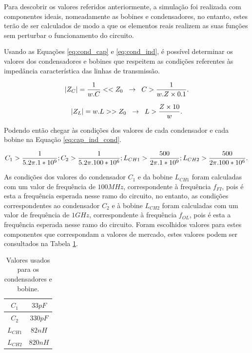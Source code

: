 \documentclass[11pt]{article}
\numberwithin{equation}{section}
\begin{document}
Para descobrir os valores referidos anteriormente, a simulação foi realizada com componentes ideais, nomeadamente as bobines e condensadores, no entanto, estes terão de ser calculados de modo a que os elementos reais realizem as suas funções sem perturbar o funcionamento do circuito.

Usando as Equações \ref{eq:cond_cap} e \ref{eq:cond_ind}, é possível determinar os valores dos condensadores e bobines que respeitem as condições referentes às impedância característica das linhas de transmissão.

\begin{equation}
\lvert Z_C \rvert = \frac{1}{w.C} << Z_0 \hspace{2mm} \rightarrow \hspace{2mm} C > \frac{1}{w.Z \times 0.1}.
\label{eq:cond_cap}
\end{equation}

\begin{equation}
\lvert Z_L \rvert = w.L >> Z_0 \hspace{2mm} \rightarrow \hspace{2mm} L > \frac{Z \times 10}{w}.
\label{eq:cond_ind}
\end{equation}

Podendo então chegar às condições dos valores de cada condensador e cada bobine na Equação \ref{eq:cap_ind_cond}.

\begin{equation}
\centering
C_{1}>\frac{1}{5.2\pi.1*10^{9}}; C_{2}>\frac{1}{5.2\pi.100*10^{6}}; L_{CH1}>\frac{500}{2\pi.1*10^{9}}; L_{CH2}>\frac{500}{2\pi.100*10^{6}}.
\label{eq:cap_ind_cond}
\end{equation}

As condições dos valores do condensador $ C_{1} $ e da bobine $ L_{CH1} $ foram calculadas com um valor de frequência de $ 100MHz $, correspondente à frequência $ f_{FI} $, pois é esta a frequência esperada nesse ramo do circuito, no entanto, as condições correspondentes ao condensador $ C_{2} $ e à bobine $ L_{CH2} $ foram calculadas com um valor de frequência de $ 1GHz $, correspondente à frequência $ f_{OL} $, pois é esta a frequência esperada nesse ramo do circuito. Foram escolhidos valores para estes componentes que correspondam a valores de mercado, estes valores podem ser consultados na Tabela \ref{tab:cap_ind}.

\begin{table}
	\centering
	\begin{tabular}{|c||c|}
		\hline $ C_{1} $ & $ 33pF $ \\ 
		\hline $ C_{2} $ & $ 330pF $ \\ 
		\hline $ L_{CH1} $ & $ 82nH $ \\ 
		\hline $ L_{CH2} $ & $ 820nH $ \\ 
		\hline 
	\end{tabular} 
	\caption{Valores usados para os condensadores e bobine.}
	\label{tab:cap_ind}
\end{table}
\end{document}

